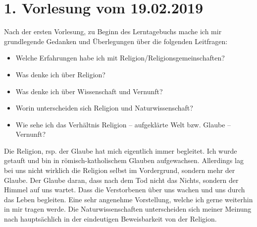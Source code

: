 \section*{1. Vorlesung vom 19.02.2019}
Nach der ersten Vorlesung, zu Beginn des Lerntagebuchs mache ich mir grundlegende Gedanken und Überlegungen über die folgenden Leitfragen:\\
\begin{itemize}
\item Welche Erfahrungen habe ich mit Religion/Religionsgemeinschaften?\\
\item Was denke ich über Religion?\\
\item Was denke ich über Wissenschaft und Vernunft?\\
\item Worin unterscheiden sich Religion und Naturwissenschaft?\\
\item Wie sehe ich das Verhältnis Religion – aufgeklärte Welt bzw. Glaube – Vernunft?
\end{itemize}

\hrulefill

Die Religion, rsp. der Glaube hat mich eigentlich immer begleitet. Ich wurde getauft und bin in römisch-katholischem Glauben aufgewachsen. Allerdings lag bei uns nicht wirklich die Religion selbst im Vordergrund, sondern mehr der Glaube. Der Glaube daran, dass nach dem Tod nicht das Nichts, sondern der Himmel auf uns wartet. Dass die Verstorbenen über uns wachen und uns durch das Leben begleiten. Eine sehr angenehme Vorstellung, welche ich gerne weiterhin in mir tragen werde. Die Naturwissenschaften unterscheiden sich meiner Meinung nach hauptsächlich in der eindeutigen Beweisbarkeit von der Religion. \\

